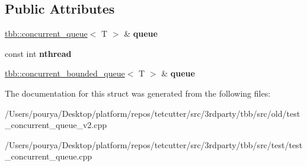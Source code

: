 \subsection*{Public Attributes}
\begin{DoxyCompactItemize}
\item 
\hypertarget{structTestNegativeQueueBody_a570fcce01301653e99dd55381a13d585}{}\hyperlink{classtbb_1_1concurrent__queue}{tbb\+::concurrent\+\_\+queue}$<$ T $>$ \& {\bfseries queue}\label{structTestNegativeQueueBody_a570fcce01301653e99dd55381a13d585}

\item 
\hypertarget{structTestNegativeQueueBody_aa3e4286eba780d8b3ad23a1b26251165}{}const int {\bfseries nthread}\label{structTestNegativeQueueBody_aa3e4286eba780d8b3ad23a1b26251165}

\item 
\hypertarget{structTestNegativeQueueBody_a852e0bfa32d5d653b4fd2c69e50cf89c}{}\hyperlink{classtbb_1_1concurrent__bounded__queue}{tbb\+::concurrent\+\_\+bounded\+\_\+queue}$<$ T $>$ \& {\bfseries queue}\label{structTestNegativeQueueBody_a852e0bfa32d5d653b4fd2c69e50cf89c}

\end{DoxyCompactItemize}


The documentation for this struct was generated from the following files\+:\begin{DoxyCompactItemize}
\item 
/\+Users/pourya/\+Desktop/platform/repos/tetcutter/src/3rdparty/tbb/src/old/test\+\_\+concurrent\+\_\+queue\+\_\+v2.\+cpp\item 
/\+Users/pourya/\+Desktop/platform/repos/tetcutter/src/3rdparty/tbb/src/test/test\+\_\+concurrent\+\_\+queue.\+cpp\end{DoxyCompactItemize}
